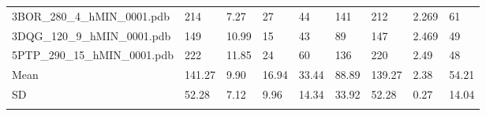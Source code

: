 \documentclass{bioinfo}
\begin{document}
\begin{table}[!t]
{\begin{tabular}{lllllllll}
    3BOR\_280\_4\_hMIN\_0001.pdb & 214      & 7.27       & 27          & 44          & 141         & 212     & 2.269           & 61           \\
    3DQG\_120\_9\_hMIN\_0001.pdb & 149      & 10.99      & 15          & 43          & 89          & 147     & 2.469           & 49           \\
    5PTP\_290\_15\_hMIN\_0001.pdb & 222      & 11.85      & 24          & 60          & 136         & 220     & 2.49            & 48           \\ \midrule
    Mean                      & 141.27 & 9.90  & 16.94      & 33.44       & 88.89       & 139.27      & 2.38    & 54.21            \\
    SD                        & 52.28    & 7.12       & 9.96        & 14.34       & 33.92       & 52.28   & 0.27            & 14.04        \\ \botrule
\end{tabular}}{}
\end{table}
\end{document}
